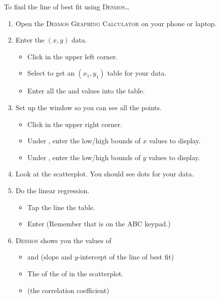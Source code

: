 \begin{myConcept}{To find the line of best fit using {\scshape Desmos}\dots}
    \begin{enumerate}[]
        \item Open the {\scshape Desmos Graphing Calculator} on your phone or laptop.
        \item Enter the $(x,y)$ data.
            \begin{itemize}
                \item Click 
                    in the upper left corner.
                \item Select  to get an $(x_1,y_1)$ table for your data.
                \item Enter all the  and  values into the table.
            \end{itemize}
        \item Set up the window so you can see all the points.
            \begin{itemize}
                \item Click 
                    in the upper right corner.
                \item Under , enter the low/high bounds of $x$ values to display.
                \item Under , enter the low/high bounds of $y$ values to display.
            \end{itemize}
        \item Look at the scatterplot. You should see dots for your data.
        \item Do the linear regression.
            \begin{itemize}
                \item Tap the line  the table.
                \item Enter 
                    \quad (Remember that \fbox{$\thicksim$} is on the {\ttfamily ABC} keypad.) 
            \end{itemize}
        \item {\scshape Desmos} shows you the values of
            \begin{itemize}
                \item {} and  (slope and $y$-intercept of the line of best fit)
                \item The  of the  of   in the scatterplot.
                \item {} (the correlation coefficient)
            \end{itemize}
    \end{enumerate}
\end{myConcept}


